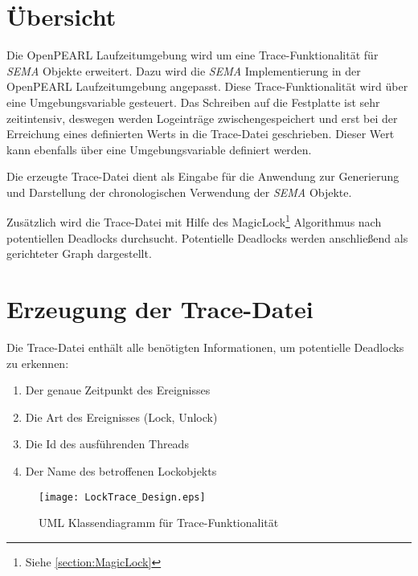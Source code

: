\section{Übersicht}
\label{section:Übersicht}
Die OpenPEARL Laufzeitumgebung wird um eine Trace-Funktionalität für
\textit{SEMA} Objekte erweitert. Dazu wird die \textit{SEMA} Implementierung in
der OpenPEARL Laufzeitumgebung angepasst. Diese Trace-Funktionalität wird über
eine Umgebungsvariable gesteuert. Das Schreiben auf die Festplatte ist sehr
zeitintensiv, deswegen werden Logeinträge zwischengespeichert und erst bei der
Erreichung eines definierten Werts in die Trace-Datei geschrieben. Dieser Wert
kann ebenfalls über eine Umgebungsvariable definiert werden. 

Die erzeugte Trace-Datei dient als Eingabe für die Anwendung zur Generierung und
Darstellung der chronologischen Verwendung der \textit{SEMA} Objekte.

Zusätzlich wird die Trace-Datei mit Hilfe des MagicLock\footnote{Siehe
\cref{section:MagicLock}} Algorithmus nach potentiellen Deadlocks durchsucht.
Potentielle Deadlocks werden anschließend als gerichteter Graph dargestellt.

\section{Erzeugung der Trace-Datei}
\label{section:Erzeugung der Trace-Datei}
Die Trace-Datei enthält alle benötigten Informationen, um potentielle Deadlocks
zu erkennen:
\begin{enumerate}
  \item Der genaue Zeitpunkt des Ereignisses 
  \item Die Art des Ereignisses (Lock, Unlock)
  \item Die Id des ausführenden Threads
  \item Der Name des betroffenen Lockobjekts
\end{enumerate}

\begin{figure}[ht]
  \texttt{[image: LockTrace\_Design.eps]}
  \caption{UML Klassendiagramm für Trace-Funktionalität}
  \label{fig:LockTrace_Design}
\end{figure}

